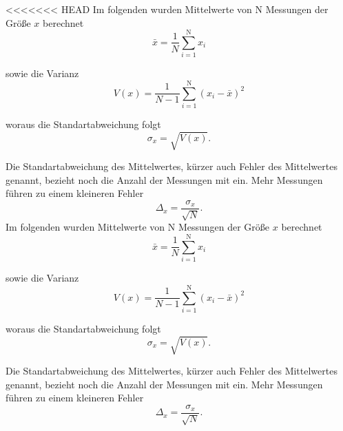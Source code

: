 <<<<<<< HEAD
Im folgenden wurden Mittelwerte von N Messungen der Größe $x$ berechnet
\begin {equation}
\bar{x} =  \frac{1}{N} \sum_{i=1}^\text{N} x_i
\end{equation}

sowie die Varianz
\begin {equation}
V(x) = \frac{1}{N-1} \sum_{i=1}^\text{N} (x_i - \bar{x})^2
\end{equation}

woraus die Standartabweichung folgt
\begin {equation}
\sigma_x = \sqrt{V(x)}.
\end{equation}

Die Standartabweichung des Mittelwertes, kürzer auch Fehler des Mittelwertes genannt, bezieht noch die Anzahl der Messungen mit ein. Mehr Messungen führen zu einem kleineren Fehler
\begin {equation}
\Delta_{x} = \frac{\sigma_x}{\sqrt{N}}.
\end{equation}
Im folgenden wurden Mittelwerte von N Messungen der Größe $x$ berechnet
\begin {equation}
\bar{x} =  \frac{1}{N} \sum_{i=1}^\text{N} x_i
\end{equation}

sowie die Varianz
\begin {equation}
V(x) = \frac{1}{N-1} \sum_{i=1}^\text{N} (x_i - \bar{x})^2
\end{equation}

woraus die Standartabweichung folgt
\begin {equation}
\sigma_x = \sqrt{V(x)}.
\end{equation}

Die Standartabweichung des Mittelwertes, kürzer auch Fehler des Mittelwertes genannt, bezieht noch die Anzahl der Messungen mit ein. Mehr Messungen führen zu einem kleineren Fehler
\begin {equation}
\Delta_{x} = \frac{\sigma_x}{\sqrt{N}}.
\end{equation}
